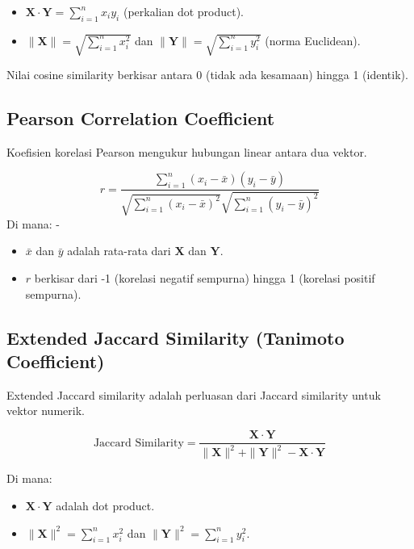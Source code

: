 \documentclass[
  oneside]{book}
\begin{document}
\begin{itemize}
\item
  \(\mathbf{X} \cdot \mathbf{Y} = \sum_{i=1}^n x_i y_i\) (perkalian dot product).
\item
  \(\|\mathbf{X}\| = \sqrt{\sum_{i=1}^n x_i^2}\) dan \(\|\mathbf{Y}\| = \sqrt{\sum_{i=1}^n y_i^2}\) (norma Euclidean).
\end{itemize}

Nilai cosine similarity berkisar antara 0 (tidak ada kesamaan) hingga 1 (identik).

\subsection{\texorpdfstring{\textbf{Pearson Correlation Coefficient}}{Pearson Correlation Coefficient}}\label{pearson-correlation-coefficient}

Koefisien korelasi Pearson mengukur hubungan linear antara dua vektor.

\[
r = \frac{\sum_{i=1}^n (x_i - \bar{x})(y_i - \bar{y})}{\sqrt{\sum_{i=1}^n (x_i - \bar{x})^2} \sqrt{\sum_{i=1}^n (y_i - \bar{y})^2}}
\]Di mana: -

\begin{itemize}
\item
  \(\bar{x}\) dan \(\bar{y}\) adalah rata-rata dari \(\mathbf{X}\) dan \(\mathbf{Y}\).
\item
  \(r\) berkisar dari -1 (korelasi negatif sempurna) hingga 1 (korelasi positif sempurna).
\end{itemize}

\subsection{\texorpdfstring{\textbf{Extended Jaccard Similarity (Tanimoto Coefficient)}}{Extended Jaccard Similarity (Tanimoto Coefficient)}}\label{extended-jaccard-similarity-tanimoto-coefficient}

Extended Jaccard similarity adalah perluasan dari Jaccard similarity untuk vektor numerik.

\[
\text{Jaccard Similarity} = \frac{\mathbf{X} \cdot \mathbf{Y}}{\|\mathbf{X}\|^2 + \|\mathbf{Y}\|^2 - \mathbf{X} \cdot \mathbf{Y}}
\]

Di mana:

\begin{itemize}
\item
  \(\mathbf{X} \cdot \mathbf{Y}\) adalah dot product.
\item
  \(\|\mathbf{X}\|^2 = \sum_{i=1}^n x_i^2\) dan \(\|\mathbf{Y}\|^2 = \sum_{i=1}^n y_i^2\).
\end{itemize}
\end{document}
